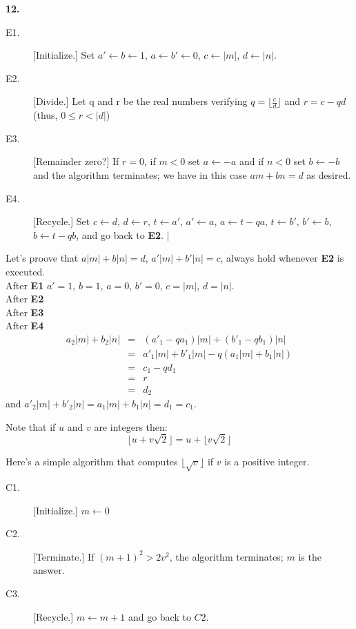\documentclass[a4paper,12pt]{article}
\begin{document}
\bigskip
\noindent
\textbf{12.}
\begin{description}
\item[E1.]
[Initialize.] Set $a' \leftarrow b \leftarrow 1$,
$a \leftarrow b' \leftarrow 0$, $c \leftarrow |m|$, $d \leftarrow |n|$.
\item[E2.]
[Divide.] Let q and r be the real numbers verifying 
$q = \lfloor \frac{c}{d} \rfloor$ and $r = c - qd$ (thus, $0 \le r < |d|$)
\item[E3.]
[Remainder zero?] If $r=0$, if $m < 0$ set $a \leftarrow -a$ and if $n < 0$
set $b \leftarrow -b$ and the algorithm terminates; we have in this case
$am + bn = d$ as desired.
\item[E4.]
[Recycle.] Set $c \leftarrow d$, $d \leftarrow r$, $t \leftarrow a'$,
$a' \leftarrow a$, $a \leftarrow t - qa$, $t \leftarrow b'$, $b' \leftarrow b$,
$b \leftarrow t - qb$, and go back to \textbf{E2}. $|$
\end{description}

Let's proove that $a|m|+b|n|=d$, $a'|m|+b'|n|=c$, always hold whenever 
\textbf{E2} is executed.\\
After \textbf{E1} $a' = 1$, $b = 1$, $a = 0$, $b' = 0$, $c = |m|$, $d = |n|$.\\
After \textbf{E2}\\
After \textbf{E3}\\
After \textbf{E4}
\begin{eqnarray*}
a_2 |m| + b_2 |n| & = & (a'_1 - qa_1)|m| + (b'_1 - qb_1)|n|\\
& = & a'_1|m|+b'_1|m| - q(a_1|m|+b_1|n|)\\
& = & c_1 - qd_1\\
& = & r\\
& = & d_2
\end{eqnarray*}
and $a'_2|m| + b'_2|n| = a_1|m|+b_1|n| = d_1 = c_1$.

\medskip
Note that if $u$ and $v$ are integers then:
\[ \lfloor u + v\sqrt{2} \rfloor = u + \lfloor v\sqrt{2} \rfloor \]

Here's a simple algorithm that computes $\lfloor \sqrt{v} \rfloor$ if $v$
is a positive integer.
\begin{description}
\item[C1.]
[Initialize.] $m \leftarrow 0$
\item[C2.]
[Terminate.] If $(m+1)^2 > 2 v^2$, the algorithm terminates; $m$ is the answer.
\item[C3.]
[Recycle.] $m \leftarrow m+1$ and go back to $C2$.
\end{description}
\end{document}
